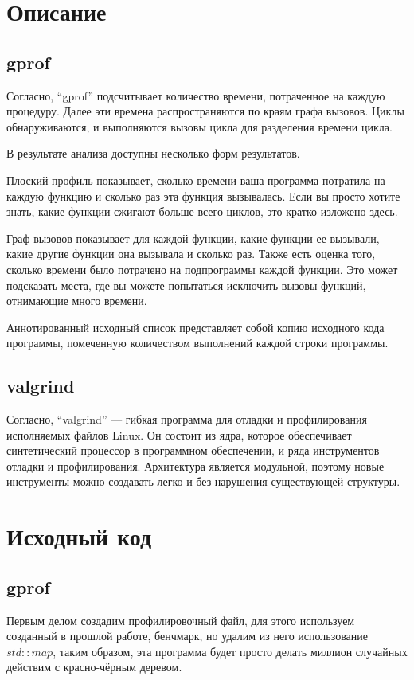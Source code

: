 \section{Описание}

\subsection{gprof}
Согласно, \cite{gprof_man} \enquote{gprof} подсчитывает количество времени, потраченное на каждую процедуру. Далее эти времена распространяются по краям графа вызовов. Циклы обнаруживаются, и выполняются вызовы цикла для разделения времени цикла.

В результате анализа доступны несколько форм результатов.

Плоский профиль показывает, сколько времени ваша программа потратила на каждую функцию и сколько раз эта функция вызывалась. Если вы просто хотите знать, какие функции сжигают больше всего циклов, это кратко изложено здесь.

Граф вызовов показывает для каждой функции, какие функции ее вызывали, какие другие функции она вызывала и сколько раз. Также есть оценка того, сколько времени было потрачено на подпрограммы каждой функции. Это может подсказать места, где вы можете попытаться исключить вызовы функций, отнимающие много времени.

Аннотированный исходный список представляет собой копию исходного кода программы, помеченную количеством выполнений каждой строки программы.

\subsection{valgrind}
Согласно, \cite{valgrind_man} \enquote{valgrind} — гибкая программа для отладки и профилирования исполняемых файлов Linux. Он состоит из ядра, которое обеспечивает синтетический процессор в программном обеспечении, и ряда инструментов отладки и профилирования. Архитектура является модульной, поэтому новые инструменты можно создавать легко и без нарушения существующей структуры.


\pagebreak

\section{Исходный код}

\subsection{gprof}
Первым делом создадим профилировочный файл, для этого используем созданный в прошлой работе, бенчмарк, но удалим из него использование $std::map$, таким образом, эта программа будет просто делать миллион случайных действим с красно-чёрным деревом.

